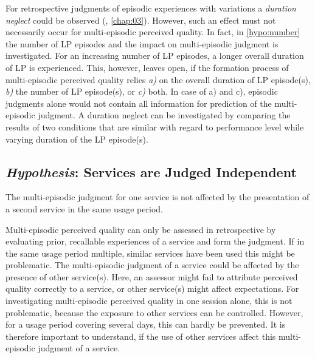 For retrospective judgments of episodic experiences with variations a \emph{duration neglect} could be observed (\cf, \autoref{chap:03}).
However, such an effect must not necessarily occur for multi-episodic perceived quality.
In fact, in \autoref{hypo:number} the number of \ac{LP} episodes and the impact on multi-episodic judgment is investigated.
For an increasing number of \ac{LP} episodes, a longer overall duration of \ac{LP} is experienced.
This, however, leaves open, if the formation process of multi-episodic perceived quality relies \emph{a)} on the overall duration of \ac{LP} episode(s), \emph{b)} the number of \ac{LP} episode(s), or \emph{c)} both.
In case of a) and c), episodic judgments alone would not contain all information for prediction of the multi-episodic judgment.
A duration neglect can be investigated by comparing the results of two conditions that are similar with regard to performance level while varying duration of the \ac{LP} episode(s).

\subsection{\emph{Hypothesis}: Services are Judged Independent}
\begin{hypothesis}\label{hypo:independent}
The multi-episodic judgment for one service is not affected by the presentation of a second service in the same usage period.
\end{hypothesis}

Multi-episodic perceived quality can only be assessed in retrospective by evaluating prior, recallable experiences of a service and form the judgment.
If in the same usage period multiple, similar services have been used this might be problematic.
The multi-episodic judgment of a service could be affected by the presence of other service(s).
Here, an assessor might fail to attribute perceived quality correctly to a service, or other service(s) might affect expectations.
For investigating multi-episodic perceived quality in one session alone, this is not problematic, because the exposure to other services can be controlled.
However, for a usage period covering several days, this can hardly be prevented.
It is therefore important to understand, if the use of other services affect this multi-episodic judgment of a service.

